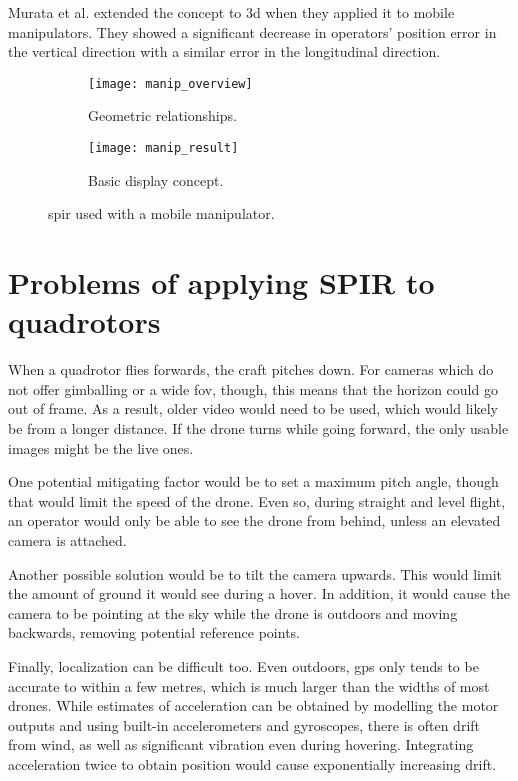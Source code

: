     Murata et al. extended the concept to \gls{3d} when they applied it to mobile manipulators.\cite{murata2014}
    They showed a significant decrease in operators' position error in the vertical direction with a similar error in the longitudinal direction.

    \begin{figure}[h]
      \centering
      \begin{subfigure}[b]{0.45\textwidth}
	\texttt{[image: manip\_overview]}
	\caption{Geometric relationships.}
	\label{fig:manip_overview_background}
      \end{subfigure}
      \hfill
      \begin{subfigure}[b]{0.45\textwidth}
	\texttt{[image: manip\_result]}
	\caption{Basic display concept.}
      \end{subfigure}
      \caption[\acrshort{spir} with mobile manipulator]{\gls{spir} used with a mobile manipulator.\cite{murata2014}}
      \label{fig:manip_results}
    \end{figure}

\section{Problems of applying SPIR to quadrotors}
  When a quadrotor flies forwards, the craft pitches down.
  For cameras which do not offer gimballing or a wide \gls{fov}, though, this means that the horizon could go out of frame.
  As a result, older video would need to be used, which would likely be from a longer distance.
  If the drone turns while going forward, the only usable images might be the live ones.

  One potential mitigating factor would be to set a maximum pitch angle, though that would limit the speed of the drone.
  Even so, during straight and level flight, an operator would only be able to see the drone from behind, unless an elevated camera is attached.

  Another possible solution would be to tilt the camera upwards.
  This would limit the amount of ground it would see during a hover.
  In addition, it would cause the camera to be pointing at the sky while the drone is outdoors and moving backwards, removing potential reference points.

  Finally, localization can be difficult too.
  Even outdoors, \gls{gps} only tends to be accurate to within a few metres, which is much larger than the widths of most drones.
  While estimates of acceleration can be obtained by modelling the motor outputs and using built-in accelerometers and gyroscopes, there is often drift from wind, as well as significant vibration even during hovering.
  Integrating acceleration twice to obtain position would cause exponentially increasing drift.


